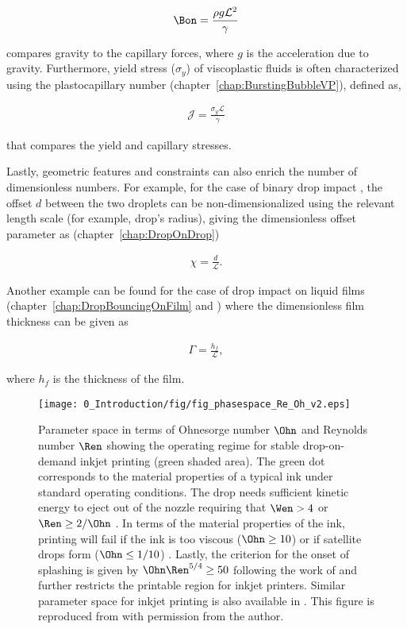 \begin{align}\label{Ch0::Bo}
	\Bon = \frac{\rho g\mathcal{L}^2}{\gamma}
\end{align}

\noindent compares gravity to the capillary forces, where $g$ is the acceleration due to gravity. Furthermore, yield stress ($\sigma_y$) of viscoplastic fluids is often characterized using the plastocapillary number (chapter~\ref{chap:BurstingBubbleVP}), defined as, 

\begin{align}\label{Ch0::J}
	\mathcal{J} = \frac{\sigma_y\mathcal{L}}{\gamma}
\end{align}

\noindent that compares the yield and capillary stresses. 

Lastly, geometric features and constraints can also enrich the number of dimensionless numbers. For example, for the case of binary drop impact \citep{jiang1992, qian1997}, the offset $d$ between the two droplets can be non-dimensionalized using the relevant length scale (for example, drop's radius), giving the dimensionless offset parameter as (chapter~\ref{chap:DropOnDrop})

\begin{align}\label{Ch0::X}
		\chi = \frac{d}{\mathcal{L}}.
\end{align}

Another example can be found for the case of drop impact on liquid films (chapter~\ref{chap:DropBouncingOnFilm} and \citet{tang2019bouncing}) where the dimensionless film thickness can be given as

\begin{align}\label{Ch0::Gamma}
		\Gamma = \frac{h_f}{\mathcal{L}},
\end{align}

\noindent where $h_f$ is the thickness of the film.

\begin{figure}
	\centering
	\texttt{[image: 0\_Introduction/fig/fig\_phasespace\_Re\_Oh\_v2.eps]}
	\caption{Parameter space in terms of Ohnesorge number $\Ohn$ and Reynolds number $\Ren$ showing the operating regime for stable drop-on-demand inkjet printing (green shaded area). The green dot corresponds to the material properties of a typical ink under standard operating conditions. The drop needs sufficient kinetic energy to eject out of the nozzle requiring that $\Wen > 4$ or $\Ren \ge 2/\Ohn$ \citep{reitz1998drop}. In terms of the material properties of the ink, printing will fail if the ink is too viscous ($\Ohn \ge 10$) or if satellite drops form ($\Ohn \le 1/10$) \citep{notz2004dynamics, dong2006experimental, xu2007nonsolvent}. Lastly, the criterion for the onset of splashing is given by $\Ohn\Ren^{5/4} \ge 50$ following the work of \citet[][also see chapter~\ref{chap:DropForces}]{derby2010inkjet} and further restricts the printable region for inkjet printers. Similar parameter space for inkjet printing is also available in \citet{von1937anwendung, derby2010inkjet, mckinley2011wolfgang, lohse2022fundamental}. This figure is reproduced from \citet{lohse2022fundamental} with permission from the author.}
	\label{Ch0::Fig4}
\end{figure}

